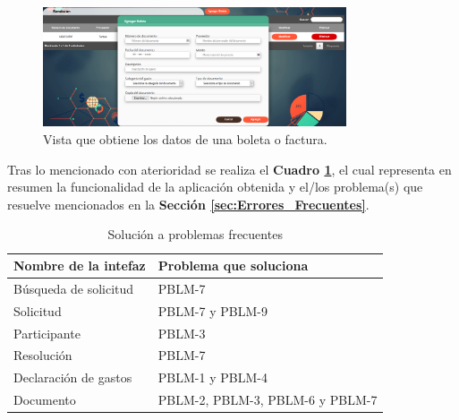     \begin{figure}[h]
        \centering
        \includegraphics[width= 0.8\textwidth]{Imagenes/AgregarBoletas.PNG}
        \caption{\label{fig: AgregarBoletas}Vista que obtiene los datos de una boleta o factura.}
    \end{figure}


\vspace{10mm}
Tras lo mencionado con aterioridad se realiza el \textbf{Cuadro \ref{tab: Solucion_Problemas_Frecuentes}}, el cual representa en resumen la funcionalidad de la aplicación obtenida y el/los problema(s) que resuelve mencionados en la  \textbf{Sección \ref{sec:Errores_Frecuentes}}.

\begin{table}[htbp]
    \centering
    \caption{Solución a problemas frecuentes}
    \label{tab: Solucion_Problemas_Frecuentes}
    \begin{tabular}{| p{7.4cm}| p{7.4cm} |}
    \hline
    \textbf{Nombre de la intefaz} & \textbf{Problema que soluciona} \\
    \hline \hline
    
    Búsqueda de solicitud & PBLM-7 \\ \hline

    Solicitud & PBLM-7 y PBLM-9\\ \hline

    Participante & PBLM-3 \\ \hline

    Resolución & PBLM-7 \\ \hline

    Declaración de gastos & PBLM-1 y PBLM-4 \\ \hline

    Documento & PBLM-2, PBLM-3, PBLM-6 y PBLM-7 \\ \hline
    \end{tabular}
\end{table}